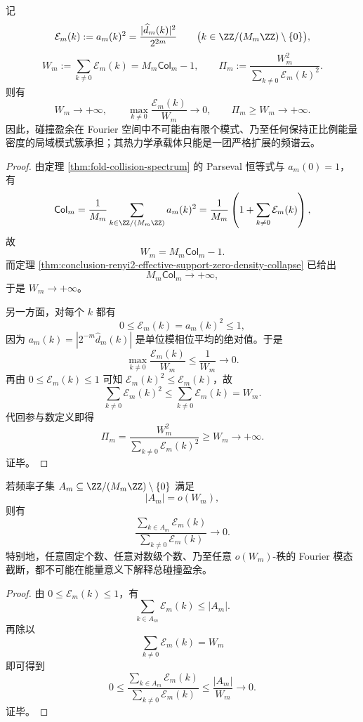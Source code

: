 \begin{theorem}[碰撞盈余谱的严格去局域化]\label{thm:conclusion-fourier-excess-complete-delocalization}
记
\[
\mathcal E_m(k):=a_m(k)^2=\frac{|\widehat d_m(k)|^2}{2^{2m}}
\qquad
\bigl(k\in \ZZ/(M_m\ZZ)\setminus\{0\}\bigr),
\]
\[
W_m:=\sum_{k\ne 0}\mathcal E_m(k)=M_m\mathsf{Col}_m-1,
\qquad
\Pi_m:=\frac{W_m^2}{\sum_{k\ne 0}\mathcal E_m(k)^2}.
\]
则有
\[
W_m\longrightarrow +\infty,
\qquad
\max_{k\ne 0}\frac{\mathcal E_m(k)}{W_m}\longrightarrow 0,
\qquad
\Pi_m\ge W_m\longrightarrow +\infty.
\]
因此，碰撞盈余在 Fourier 空间中不可能由有限个模式、乃至任何保持正比例能量密度的局域模式簇承担；其热力学承载体只能是一团严格扩展的频谱云。
\end{theorem}

\begin{proof}
由定理 \ref{thm:fold-collision-spectrum} 的 Parseval 恒等式与 \(a_m(0)=1\)，有
\[
\mathsf{Col}_m
=
\frac1{M_m}\sum_{k\in \ZZ/(M_m\ZZ)}a_m(k)^2
=
\frac1{M_m}\left(1+\sum_{k\ne 0}\mathcal E_m(k)\right),
\]
故
\[
W_m=M_m\mathsf{Col}_m-1.
\]
而定理 \ref{thm:conclusion-renyi2-effective-support-zero-density-collapse} 已给出
\[
M_m\mathsf{Col}_m\to+\infty,
\]
于是 \(W_m\to+\infty\)。

另一方面，对每个 \(k\) 都有
\[
0\le \mathcal E_m(k)=a_m(k)^2\le 1,
\]
因为 \(a_m(k)=|2^{-m}\widehat d_m(k)|\) 是单位模相位平均的绝对值。于是
\[
\max_{k\ne 0}\frac{\mathcal E_m(k)}{W_m}\le \frac{1}{W_m}\to 0.
\]
再由 \(0\le \mathcal E_m(k)\le 1\) 可知 \(\mathcal E_m(k)^2\le \mathcal E_m(k)\)，故
\[
\sum_{k\ne 0}\mathcal E_m(k)^2\le \sum_{k\ne 0}\mathcal E_m(k)=W_m.
\]
代回参与数定义即得
\[
\Pi_m=\frac{W_m^2}{\sum_{k\ne 0}\mathcal E_m(k)^2}\ge W_m\to+\infty.
\]
证毕。
\end{proof}

\begin{corollary}[次线性谱截断的能量不完备性]\label{cor:conclusion-sublinear-rank-spectral-truncation-incomplete}
若频率子集 \(A_m\subseteq \ZZ/(M_m\ZZ)\setminus\{0\}\) 满足
\[
|A_m|=o(W_m),
\]
则有
\[
\frac{\sum_{k\in A_m}\mathcal E_m(k)}{\sum_{k\ne 0}\mathcal E_m(k)}\longrightarrow 0.
\]
特别地，任意固定个数、任意对数级个数、乃至任意 \(o(W_m)\)-秩的 Fourier 模态截断，都不可能在能量意义下解释总碰撞盈余。
\end{corollary}

\begin{proof}
由 \(0\le \mathcal E_m(k)\le 1\)，有
\[
\sum_{k\in A_m}\mathcal E_m(k)\le |A_m|.
\]
再除以
\[
\sum_{k\ne 0}\mathcal E_m(k)=W_m
\]
即可得到
\[
0\le
\frac{\sum_{k\in A_m}\mathcal E_m(k)}{\sum_{k\ne 0}\mathcal E_m(k)}
\le
\frac{|A_m|}{W_m}\to 0.
\]
证毕。
\end{proof}


